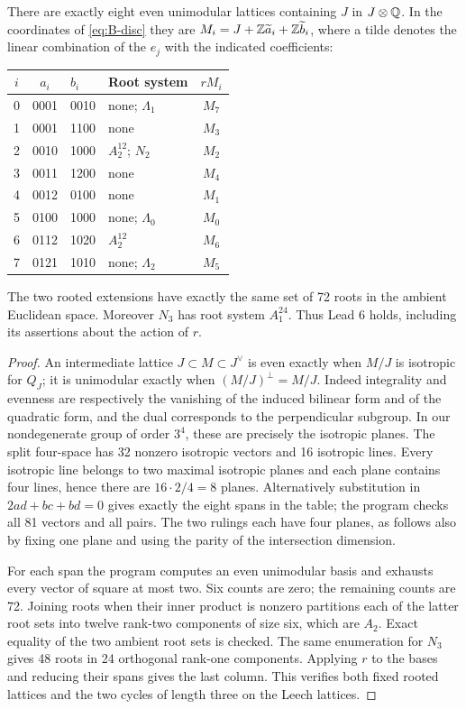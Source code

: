 \begin{statement}
There are exactly eight even unimodular lattices containing \(J\) in
\(J\otimes\mathbb Q\). In the coordinates of \eqref{eq:B-disc} they are
\(M_i=J+\mathbb Z\widetilde a_i+\mathbb Z\widetilde b_i\), where a tilde denotes the
linear combination of the \(e_j\) with the indicated coefficients:
\begin{center}\small
\begin{tabular}{ccllc}
\toprule
\(i\)&\(a_i\)&\(b_i\)&Root system&\(rM_i\)\\\midrule
0&0001&0010&none; \(\Lambda_1\)&\(M_7\)\\
1&0001&1100&none&\(M_3\)\\
2&0010&1000&\(A_2^{12}\); \(N_2\)&\(M_2\)\\
3&0011&1200&none&\(M_4\)\\
4&0012&0100&none&\(M_1\)\\
5&0100&1000&none; \(\Lambda_0\)&\(M_0\)\\
6&0112&1020&\(A_2^{12}\)&\(M_6\)\\
7&0121&1010&none; \(\Lambda_2\)&\(M_5\)\\\bottomrule
\end{tabular}
\end{center}
The two rooted extensions have exactly the same set of 72 roots in the
ambient Euclidean space. Moreover \(N_3\) has root system \(A_1^{24}\).
Thus Lead 6 holds, including its assertions about the action of \(r\).
\end{statement}

\begin{proof}
An intermediate lattice \(J\subset M\subset J^\vee\) is even exactly
when \(M/J\) is isotropic for \(Q_J\); it is unimodular exactly when
\((M/J)^\perp=M/J\). Indeed integrality and evenness are respectively
the vanishing of the induced bilinear form and of the quadratic form,
and the dual corresponds to the perpendicular subgroup. In our
nondegenerate group of order \(3^4\), these are precisely the isotropic
planes. The split four-space has 32 nonzero isotropic vectors and
16 isotropic lines. Every isotropic line belongs to two maximal
isotropic planes and each plane contains four lines, hence there are
\(16\cdot2/4=8\) planes. Alternatively substitution in
\(2ad+bc+bd=0\) gives exactly the eight spans in the table; the program
checks all 81 vectors and all pairs. The two rulings each have four
planes, as follows also by fixing one plane and using the parity of
the intersection dimension.

For each span the program computes an even unimodular basis and
exhausts every vector of square at most two. Six counts are zero;
the remaining counts are 72. Joining roots when their inner product
is nonzero partitions each of the latter root sets into twelve
rank-two components of size six, which are \(A_2\). Exact equality
of the two ambient root sets is checked. The same enumeration for
\(N_3\) gives 48 roots in 24 orthogonal rank-one components.
Applying \(r\) to the bases and reducing their spans gives the last
column. This verifies both fixed rooted lattices and the two cycles
of length three on the Leech lattices.
\end{proof}

